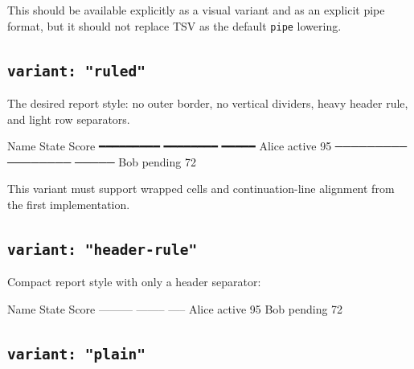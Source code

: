 This should be available explicitly as a visual variant and as an explicit pipe format, but it should not replace TSV as the default \texttt{p\allowbreak{}i\allowbreak{}p\allowbreak{}e} lowering.

\subsection{\texorpdfstring{\texttt{v\allowbreak{}a\allowbreak{}r\allowbreak{}i\allowbreak{}a\allowbreak{}n\allowbreak{}t\allowbreak{}:\allowbreak{} \allowbreak{}"\allowbreak{}r\allowbreak{}u\allowbreak{}l\allowbreak{}e\allowbreak{}d\allowbreak{}"}}{}}\label{record-133-variant-ruled}

The desired report style: no outer border, no vertical dividers, heavy header rule, and light row separators.

\begin{CodeBlock}
Name       State     Score
━━━━━━━━━  ━━━━━━━━  ━━━━━
Alice      active    95
─────────  ────────  ─────
Bob        pending   72
\end{CodeBlock}

This variant must support wrapped cells and continuation-line alignment from the first implementation.

\subsection{\texorpdfstring{\texttt{v\allowbreak{}a\allowbreak{}r\allowbreak{}i\allowbreak{}a\allowbreak{}n\allowbreak{}t\allowbreak{}:\allowbreak{} \allowbreak{}"\allowbreak{}h\allowbreak{}e\allowbreak{}a\allowbreak{}d\allowbreak{}e\allowbreak{}r\allowbreak{}-\allowbreak{}r\allowbreak{}u\allowbreak{}l\allowbreak{}e\allowbreak{}"}}{}}\label{record-133-variant-header-rule}

Compact report style with only a header separator:

\begin{CodeBlock}
Name       State     Score
---------  --------  -----
Alice      active    95
Bob        pending   72
\end{CodeBlock}

\subsection{\texorpdfstring{\texttt{v\allowbreak{}a\allowbreak{}r\allowbreak{}i\allowbreak{}a\allowbreak{}n\allowbreak{}t\allowbreak{}:\allowbreak{} \allowbreak{}"\allowbreak{}p\allowbreak{}l\allowbreak{}a\allowbreak{}i\allowbreak{}n\allowbreak{}"}}{}}\label{record-133-variant-plain}

